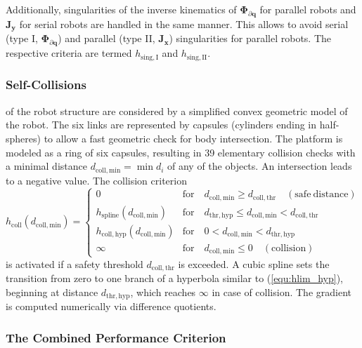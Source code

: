 \documentclass[runningheads]{llncs}
\newcommand{\bm}[1]{\boldsymbol{#1}}
\begin{document}
Additionally, singularities of the inverse kinematics of $\bm{\Phi}_{\partial \bm{q}}$ for parallel robots and $\bm{J}_{\bm{y}}$ for serial robots are handled in the same manner.
This allows to avoid serial (type I, $\bm{\Phi}_{\partial \bm{q}}$) and parallel (type II, $\bm{J}_{\bm{x}}$) singularities for parallel robots.
The respective criteria are termed $h_{\mathrm{sing,I}}$ and $h_{\mathrm{sing,II}}$.

\subsubsection{Self-Collisions}

of the robot structure are considered by a simplified convex geometric model of the robot.
The six links are represented by capsules (cylinders ending in half-spheres) to allow a fast geometric check for body intersection.
The platform is modeled as a ring of six capsules, resulting in 39 elementary collision checks with a minimal distance $d_{\mathrm{coll,min}}=\min{d_{i}}$ of any of the objects.
An intersection leads to a negative value. 
The collision criterion 
%
\begin{equation}
h_{\mathrm{coll}}(d_{\mathrm{coll,min}})
=
\begin{cases} 
0 & \mathrm{for} \quad d_{\mathrm{coll,min}} \geq d_{\mathrm{coll,thr}} \quad \mathrm{(safe~distance)} \\
h_{\mathrm{spline}}(d_{\mathrm{coll,min}}) & \mathrm{for} \quad d_{\mathrm{thr,hyp}} \leq d_{\mathrm{coll,min}} < d_{\mathrm{coll,thr}} \\
h_{\mathrm{coll,hyp}}(d_{\mathrm{coll,min}}) & \mathrm{for} \quad 0 < d_{\mathrm{coll,min}} <  d_{\mathrm{thr,hyp}} \\
\infty & \mathrm{for} \quad d_{\mathrm{coll,min}} \leq 0 \quad \mathrm{(collision)}
\end{cases}
\label{equ:hcoll_pw}
\end{equation}
%
is activated if a safety threshold $d_{\mathrm{coll,thr}}$ is exceeded.
A cubic spline sets the transition from zero to one branch of a hyperbola similar to (\ref{equ:hlim_hyp}), beginning at distance $d_{\mathrm{thr,hyp}}$, which reaches $\infty$ in case of collision.
The gradient is computed numerically via difference quotients.

\subsubsection{The Combined Performance Criterion}
\end{document}
